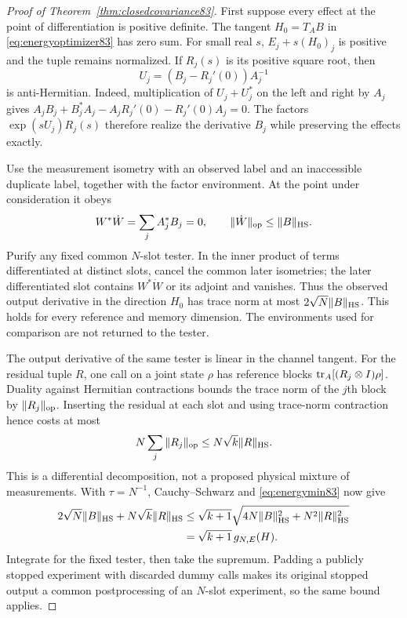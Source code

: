 \begin{proof}[Proof of Theorem~\ref{thm:closedcovariance83}]
First suppose every effect at the point of differentiation is
positive definite.  The tangent $H_0=T_AB$ in
\eqref{eq:energyoptimizer83} has zero sum.  For small real $s$,
$E_j+s(H_0)_j$ is positive and the tuple remains normalized.
If $R_j(s)$ is its positive square root, then
\[
 U_j=(B_j-R_j'(0))A_j^{-1}
\]
is anti-Hermitian.  Indeed, multiplication of $U_j+U_j^*$ on the
left and right by $A_j$ gives
$A_jB_j+B_j^*A_j-A_jR_j'(0)-R_j'(0)A_j=0$.
The factors $\exp(sU_j)R_j(s)$ therefore realize the derivative
$B_j$ while preserving the effects exactly.

Use the measurement isometry with an observed label and an
inaccessible duplicate label, together with the factor environment.
At the point under consideration it obeys
\[
 W^*\dot W=\sum_jA_j^*B_j=0,\qquad
 \|\dot W\|_{\rm op}\le\|B\|_{\rm HS}.
\]
Purify any fixed common $N$-slot tester.  In the inner product of
terms differentiated at distinct slots, cancel the common later
isometries; the later differentiated slot contains $W^*\dot W$ or
its adjoint and vanishes.  Thus the observed output derivative in
the direction $H_0$ has trace norm at most
$2\sqrt N\|B\|_{\rm HS}$.  This holds for every reference and
memory dimension.  The environments used for comparison are not
returned to the tester.

The output derivative of the same tester is linear in the channel
tangent.  For the residual tuple $R$, one call on a joint state
$\rho$ has reference blocks $\operatorname{tr}_A[(R_j\otimes I)\rho]$.
Duality against Hermitian contractions bounds the trace norm of the
$j$th block by $\|R_j\|_{\rm op}$.  Inserting the residual at each
slot and using trace-norm contraction hence costs at most
\[
 N\sum_j\|R_j\|_{\rm op}\le N\sqrt{k}\|R\|_{\rm HS}.
\]
This is a differential decomposition, not a proposed physical mixture
of measurements.  With $\tau=N^{-1}$, Cauchy--Schwarz and
\eqref{eq:energymin83} now give
\begin{align*}
 2\sqrt N\|B\|_{\rm HS}+N\sqrt{k}\|R\|_{\rm HS}
 &\le\sqrt{k+1}
       \sqrt{4N\|B\|_{\rm HS}^2+N^2\|R\|_{\rm HS}^2}\\
 &=\sqrt{k+1}\,g_{N,E}(H).
\end{align*}
Integrate for the fixed tester, then take the supremum.  Padding a
publicly stopped experiment with discarded dummy calls makes its
original stopped output a common postprocessing of an $N$-slot
experiment, so the same bound applies.


\end{proof}
